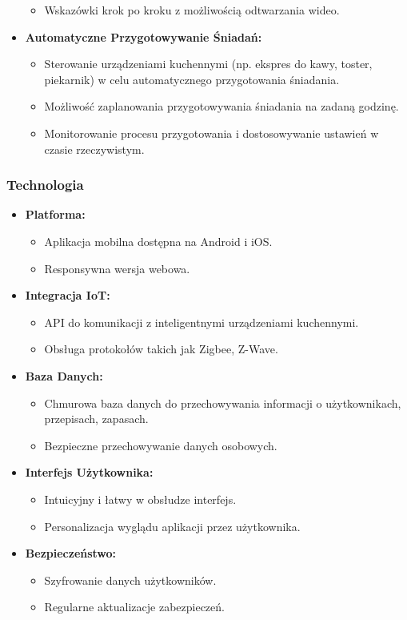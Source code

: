 \documentclass[a4paper,12pt]{article}
\begin{document}
\begin{itemize}
\begin{itemize}
        \item Wskazówki krok po kroku z możliwością odtwarzania wideo.
    \end{itemize}
    \item \textbf{Automatyczne Przygotowywanie Śniadań:}
    \begin{itemize}
        \item Sterowanie urządzeniami kuchennymi (np.
        ekspres do kawy, toster, piekarnik) w celu automatycznego przygotowania śniadania.
        \item Możliwość zaplanowania przygotowywania śniadania na zadaną godzinę.
        \item Monitorowanie procesu przygotowania i dostosowywanie ustawień w czasie rzeczywistym.
    \end{itemize}
\end{itemize}

\subsubsection{Technologia}
\begin{itemize}
    \item \textbf{Platforma:}
    \begin{itemize}
        \item Aplikacja mobilna dostępna na Android i iOS\@.
        \item Responsywna wersja webowa.
    \end{itemize}
    \item \textbf{Integracja IoT:}
    \begin{itemize}
        \item API do komunikacji z inteligentnymi urządzeniami kuchennymi.
        \item Obsługa protokołów takich jak Zigbee, Z-Wave.
    \end{itemize}
    \item \textbf{Baza Danych:}
    \begin{itemize}
        \item Chmurowa baza danych do przechowywania informacji o użytkownikach, przepisach, zapasach.
        \item Bezpieczne przechowywanie danych osobowych.
    \end{itemize}
    \item \textbf{Interfejs Użytkownika:}
    \begin{itemize}
        \item Intuicyjny i łatwy w obsłudze interfejs.
        \item Personalizacja wyglądu aplikacji przez użytkownika.
    \end{itemize}
    \item \textbf{Bezpieczeństwo:}
    \begin{itemize}
        \item Szyfrowanie danych użytkowników.
        \item Regularne aktualizacje zabezpieczeń.
    \end{itemize}
\end{itemize}
\end{document}
